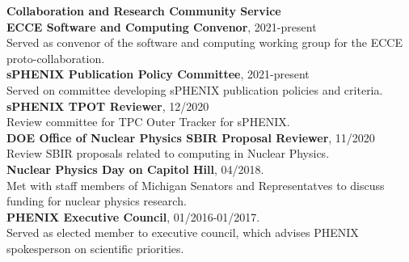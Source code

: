 \documentclass[11pt]{article}
\begin{document}
\vspace{7pt}




\begin{flushleft}
	\LARGE\textbf{Collaboration and Research Community Service} \\
	\normalsize 
	\vspace{0.3cm}
	\textbf{ECCE Software and Computing Convenor}, 2021-present \\ Served as convenor of the software and computing working group for the ECCE proto-collaboration.\\
	\vspace*{0.2cm}
	\textbf{sPHENIX Publication Policy Committee}, 2021-present \\ Served on committee developing sPHENIX publication policies and criteria. \\
	\vspace*{0.2cm}
	\textbf{sPHENIX TPOT Reviewer}, 12/2020 \\ Review committee for TPC Outer Tracker for sPHENIX. \\
	\vspace*{0.2cm}
	\textbf{DOE Office of Nuclear Physics SBIR Proposal Reviewer}, 11/2020 \\ Review SBIR proposals related to computing in Nuclear Physics. \\
	\vspace*{0.2cm}
	\textbf{Nuclear Physics Day on Capitol Hill}, 04/2018. \\ Met with staff members of Michigan Senators and Representatves to discuss funding for nuclear physics research.\\
	\vspace*{0.2cm}
	\textbf{PHENIX Executive Council}, 01/2016-01/2017.\\ Served as elected member to executive council, which advises PHENIX spokesperson on scientific priorities.
	
	
\end{flushleft}







\end{document}
